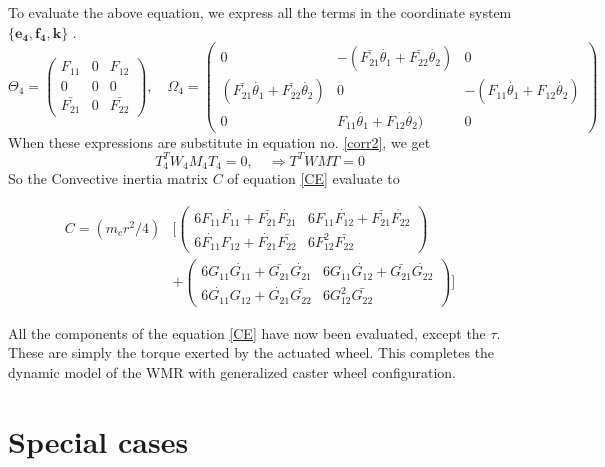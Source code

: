 To evaluate the above equation, we express  all the terms in the coordinate system $\{\mathbf{e_4,f_4,k}\}$ .
\[\Theta_4=\begin{pmatrix}
F_{11}&0&F_{12}\\
0&0&0\\
\bar{F_{21}}&0&\bar{F_{22}}
\end{pmatrix}, \quad
 \Omega_4=\begin{pmatrix}
 0& -(\bar{F_{21}}\dot{\theta_1}+\bar{F_{22}}\dot{\theta_2}) &0\\
 (\bar{F_{21}}\dot{\theta_1}+\bar{F_{22}}\dot{\theta_2}) & 0 & -(F_{11}\dot{\theta_1}+F_{12}\dot{\theta_2}) \\
 0& F_{11}\dot{\theta_1}+F_{12}\dot{\theta_2}) &0 
 \end{pmatrix}
\]
When these expressions are substitute in equation no. \ref{corr2}, we get
\begin{equation}
T^T_4W_4M_4T_4=0, \quad \Rightarrow T^TWMT=0
\end{equation} 
So the Convective inertia matrix $C$ of equation \ref{CE} evaluate to 

\begin{equation}
\label{C_final}
\begin{split}
C=
(m_cr^2/4)& \biggl[ \begin{pmatrix}
6F_{11}\dot{F_{11}}+\bar{F_{21}}\dot{F_{21}} & 6F_{11}\dot{F_{12}}+\bar{F_{21}}\dot{F_{22}}\\
6\dot{F_{11}}F_{12}+\dot{F_{21}}\bar{F_{22}} & 6F_{12}^2\bar{F_{22}}
\end{pmatrix}\\
&+\begin{pmatrix}
6G_{11}\dot{G_{11}}+\bar{G_{21}}\dot{G_{21}} & 6G_{11}\dot{G_{12}}+\bar{G_{21}}\dot{G_{22}}\\
6\dot{G_{11}}G_{12}+\dot{G_{21}}\bar{G_{22}} & 6G_{12}^2\bar{G_{22}}
\end{pmatrix} \biggr]
\end{split}
\end{equation}

All the components of the equation  \ref{CE}  have now been evaluated, except the $\tau$. These are simply the torque exerted by the actuated wheel. This completes the dynamic model of the WMR with generalized caster wheel configuration.








\section{Special cases}
